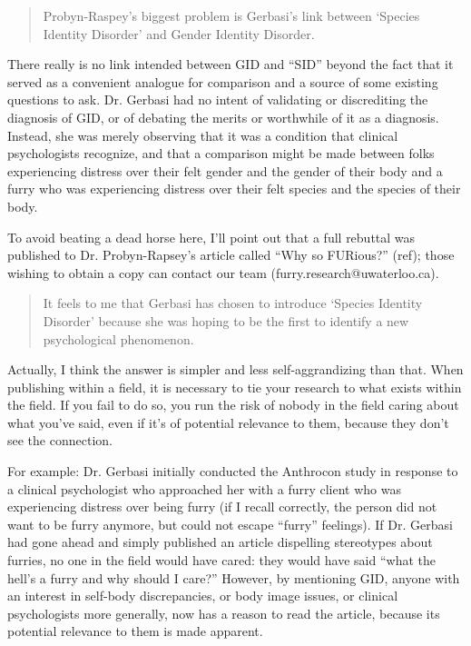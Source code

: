 \begin{quote}
  Probyn-Raspey's biggest problem is Gerbasi's link between `Species Identity Disorder' and Gender Identity Disorder.
\end{quote}

There really is no link intended between GID and ``SID'' beyond the fact that it served as a convenient analogue for comparison and a source of some existing questions to ask. Dr. Gerbasi had no intent of validating or discrediting the diagnosis of GID, or of debating the merits or worthwhile of it as a diagnosis. Instead, she was merely observing that it was a condition that clinical psychologists recognize, and that a comparison might be made between folks experiencing distress over their felt gender and the gender of their body and a furry who was experiencing distress over their felt species and the species of their body.

To avoid beating a dead horse here, I'll point out that a full rebuttal was published to Dr. Probyn-Rapsey's article called ``Why so FURious?'' (ref); those wishing to obtain a copy can contact our team (furry.research@uwaterloo.ca).

\begin{quote}
  It feels to me that Gerbasi has chosen to introduce `Species Identity Disorder' because she was hoping to be the first to identify a new psychological phenomenon.
\end{quote}

Actually, I think the answer is simpler and less self-aggrandizing than that. When publishing within a field, it is necessary to tie your research to what exists within the field. If you fail to do so, you run the risk of nobody in the field caring about what you've said, even if it's of potential relevance to them, because they don't see the connection.

For example: Dr. Gerbasi initially conducted the Anthrocon study in response to a clinical psychologist who approached her with a furry client who was experiencing distress over being furry (if I recall correctly, the person did not want to be furry anymore, but could not escape ``furry'' feelings). If Dr. Gerbasi had gone ahead and simply published an article dispelling stereotypes about furries, no one in the field would have cared: they would have said ``what the hell's a furry and why should I care?'' However, by mentioning GID, anyone with an interest in self-body discrepancies, or body image issues, or clinical psychologists more generally, now has a reason to read the article, because its potential relevance to them is made apparent.

